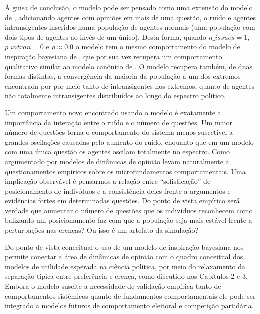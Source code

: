     À guisa de conclusão, o modelo pode ser pensado como uma extensão do modelo
    de , adicionando agentes com opiniões em
    mais de uma questão, o ruído e agentes intransigentes inseridos numa
    população de agentes normais (uma população com dois tipos de agentes ao
    invés de um único). Desta forma, quando \(n\_issues = 1\), \(p\_intran = 0\)
    e \(\rho \approx 0.0\) o modelo tem o mesmo comportamento do modelo de inspiração
    bayesiana de , que por sua vez recupera um
    comportamento qualitativo similar ao modelo canônico de
    . O modelo recupera também, de
    duas formas distintas, a convergência da maioria da população a um dos
    extremos encontrada por  por meio tanto de
    intransigentes nos extremos, quanto de agentes não totalmente intransigentes
    distribuídos ao longo do espectro político.

    Um comportamento novo encontrado usando o modelo é exatamente a importância
    da interação entre o ruído e o número de questões. Um maior número de
    questões torna o comportamento do sistema menos suscetível a grandes
    oscilações causadas pelo aumento do ruído, enquanto que em um modelo com uma
    única questão os agentes oscilam totalmente no espectro. Como argumentado
    por  modelos de dinâmicas de opinião levam
    naturalmente a questionamentos empíricos sobre os microfundamentos
    comportamentais. Uma implicação observável é pensarmos a relação entre
    ``sofisticação'' de posicionamento de indivíduos e a consistência deles
    frente a argumentos e evidências fortes em determinadas questões. Do ponto
    de vista empírico será verdade que aumentar o número de questões que os
    indivíduos reconhecem como balizando um posicionamento faz com que a
    população seja mais estável frente a perturbações nas crenças? Ou isso é um
    artefato da simulação?

    Do ponto de vista conceitual o uso de um modelo de inspiração bayesiana nos
    permite conectar a área de dinâmicas de opinião com o quadro conceitual dos
    modelos de utilidade esperada na ciência política, por meio do relaxamento
    da separação típica entre preferência e crença, como discutido nos Capítulos
    2 e 3. Embora o modelo suscite a necessidade de validação empírica tanto de
    comportamentos sistêmicos quanto de fundamentos comportamentais ele pode ser
    integrado a modelos futuros de comportamento eleitoral e competição
    partidária.


    
